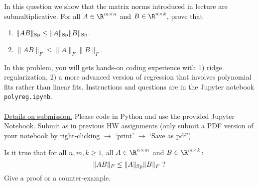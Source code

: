 \documentclass[11pt,nocut]{article}
\begin{document}
\begin{problem}[2 points]
In this question we show that the matrix norms introduced in lecture are submultiplicative. For all $A \in \R^{m \times n}$ and $B\in \R^{n \times k}$, prove that
	\begin{enumerate}[label=\normalfont(\textbf{\alph*})]

		\item $\|AB\|_{\rm Sp} \leq \|A\|_{\rm Sp} \|B\|_{\rm Sp}$. 
        \item $\|AB\|_{F} \leq \|A\|_{F} \|B\|_{F}$. 
	\end{enumerate}
\end{problem}

\vspace{5mm}

\begin{problem}[3 points]
	In this problem, you will gets hands-on coding experience with 1) ridge regularization, 2) a more advanced version of regression that involves polynomial fits rather than linear fits. Instructions and questions are in the Jupyter notebook \texttt{polyreg.ipynb}.
	\\ \\ \underline{Details on submission.} Please code in Python and use the provided Jupyter Notebook. Submit as in previous HW assignments (only submit a PDF version of your notebook by right-clicking $\to$ `print' $\to$ `Save as pdf').
\end{problem}

\vspace{5mm}

\begin{problem}[$\star$]
Is it true that for all $n,m,k \geq 1$, all $A \in \R^{n \times m}$ and $B\in \R^{m \times k}$:
			$$
			\|AB\|_{F} \leq \|A\|_{\rm Sp} \|B\|_{F} \ {\rm ?}
			$$
			Give a proof or a counter-example.
\end{problem}
\end{document}
